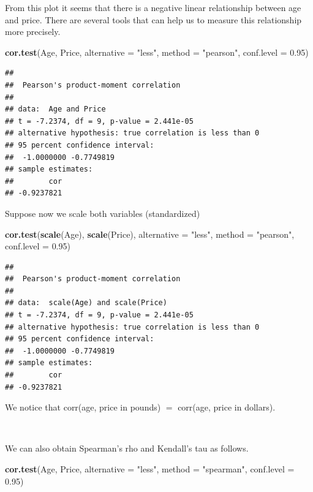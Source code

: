 \documentclass[
]{article}
\newenvironment{Shaded}{\begin{snugshade}}{\end{snugshade}}
\newcommand{\AttributeTok}[1]{\textcolor[rgb]{0.13,0.29,0.53}{#1}}
\newcommand{\FloatTok}[1]{\textcolor[rgb]{0.00,0.00,0.81}{#1}}
\newcommand{\FunctionTok}[1]{\textcolor[rgb]{0.13,0.29,0.53}{\textbf{#1}}}
\newcommand{\NormalTok}[1]{#1}
\newcommand{\StringTok}[1]{\textcolor[rgb]{0.31,0.60,0.02}{#1}}
\begin{document}
From this plot it seems that there is a negative linear relationship
between age and price. There are several tools that can help us to
measure this relationship more precisely.

\begin{Shaded}
\begin{Highlighting}[]
\FunctionTok{cor.test}\NormalTok{(Age, Price,}
         \AttributeTok{alternative =} \StringTok{"less"}\NormalTok{,}
         \AttributeTok{method =} \StringTok{"pearson"}\NormalTok{, }\AttributeTok{conf.level =} \FloatTok{0.95}\NormalTok{)}
\end{Highlighting}
\end{Shaded}

\begin{verbatim}
## 
##  Pearson's product-moment correlation
## 
## data:  Age and Price
## t = -7.2374, df = 9, p-value = 2.441e-05
## alternative hypothesis: true correlation is less than 0
## 95 percent confidence interval:
##  -1.0000000 -0.7749819
## sample estimates:
##        cor 
## -0.9237821
\end{verbatim}

Suppose now we scale both variables (standardized)

\begin{Shaded}
\begin{Highlighting}[]
\FunctionTok{cor.test}\NormalTok{(}\FunctionTok{scale}\NormalTok{(Age), }\FunctionTok{scale}\NormalTok{(Price),}
         \AttributeTok{alternative =} \StringTok{"less"}\NormalTok{,}
         \AttributeTok{method =} \StringTok{"pearson"}\NormalTok{, }\AttributeTok{conf.level =} \FloatTok{0.95}\NormalTok{)}
\end{Highlighting}
\end{Shaded}

\begin{verbatim}
## 
##  Pearson's product-moment correlation
## 
## data:  scale(Age) and scale(Price)
## t = -7.2374, df = 9, p-value = 2.441e-05
## alternative hypothesis: true correlation is less than 0
## 95 percent confidence interval:
##  -1.0000000 -0.7749819
## sample estimates:
##        cor 
## -0.9237821
\end{verbatim}

We notice that corr(age, price in pounds) \(=\) corr(age, price in
dollars).

\(~\)

We can also obtain Spearman's rho and Kendall's tau as follows.

\begin{Shaded}
\begin{Highlighting}[]
\FunctionTok{cor.test}\NormalTok{(Age, Price,}
         \AttributeTok{alternative =} \StringTok{"less"}\NormalTok{,}
         \AttributeTok{method =} \StringTok{"spearman"}\NormalTok{, }\AttributeTok{conf.level =} \FloatTok{0.95}\NormalTok{)}
\end{Highlighting}
\end{Shaded}
\end{document}
